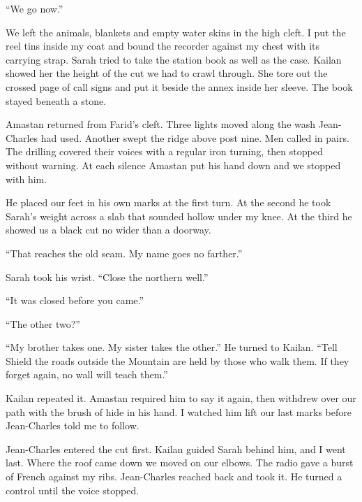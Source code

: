 ``We go now.''\par

We left the animals, blankets and empty water skins in the high cleft. I put the reel tins inside my coat and bound the recorder against my chest with its carrying strap. Sarah tried to take the station book as well as the case. Kailan showed her the height of the cut we had to crawl through. She tore out the crossed page of call signs and put it beside the annex inside her sleeve. The book stayed beneath a stone.\par

Amastan returned from Farid's cleft. Three lights moved along the wash Jean-Charles had used. Another swept the ridge above post nine. Men called in pairs. The drilling covered their voices with a regular iron turning, then stopped without warning. At each silence Amastan put his hand down and we stopped with him.\par

He placed our feet in his own marks at the first turn. At the second he took Sarah's weight across a slab that sounded hollow under my knee. At the third he showed us a black cut no wider than a doorway.\par

``That reaches the old seam. My name goes no farther.''\par

Sarah took his wrist. ``Close the northern well.''\par

``It was closed before you came.''\par

``The other two?''\par

``My brother takes one. My sister takes the other.'' He turned to Kailan. ``Tell Shield the roads outside the Mountain are held by those who walk them. If they forget again, no wall will teach them.''\par

Kailan repeated it. Amastan required him to say it again, then withdrew over our path with the brush of hide in his hand. I watched him lift our last marks before Jean-Charles told me to follow.\par

Jean-Charles entered the cut first. Kailan guided Sarah behind him, and I went last. Where the roof came down we moved on our elbows. The radio gave a burst of French against my ribs. Jean-Charles reached back and took it. He turned a control until the voice stopped.\par

